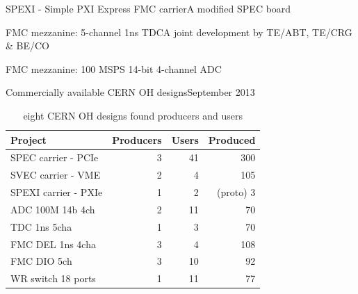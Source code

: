 \documentclass[compress,red]{beamer}
\begin{document}
\begin{frame}{SPEXI - Simple PXI Express FMC carrier}{A modified SPEC board}

  \begin{center}
  \end{center}

\end{frame}

\begin{frame}{FMC mezzanine: 5-channel 1ns TDC}{A joint development by TE/ABT, TE/CRG \& BE/CO}

  \begin{center}
  \end{center}

\end{frame}

\begin{frame}{FMC mezzanine: 100 MSPS 14-bit 4-channel ADC}

  \begin{center}
  \end{center}

\end{frame}

\begin{frame}{Commercially available CERN OH designs}{September 2013}

  \begin{table}
    \centering

    \begin{tabular}{|l||r|r|r|}
      \hline
      Project & Producers & Users & Produced\\
      \hline\hline
      SPEC carrier - PCIe & 3 & 41 & 300 \\
      \hline
      SVEC carrier - VME & 2 & 4 & 105 \\
      \hline
      SPEXI carrier - PXIe & 1 & 2 & (proto) 3 \\
      \hline
      \hline
      ADC 100M 14b 4ch & 2 & 11 & 70 \\
      \hline
      TDC 1ns 5cha & 1 & 3 & 70 \\
      \hline
      FMC DEL 1ns 4cha & 3 & 4 & 108 \\
      \hline
      FMC DIO 5ch & 3 & 10 & 92 \\
      \hline
      WR switch 18 ports & 1 & 11 & 77 \\
      \hline
    \end{tabular}

    \caption{eight CERN OH designs found producers and users}
  \end{table}

\end{frame}
\end{document}
